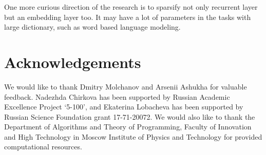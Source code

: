 \documentclass{article}
\begin{document}
One more curious direction of the research is to sparsify not only recurrent layer but an embedding layer too. It may have a lot of parameters in the tasks with large dictionary, such as word based language modeling. 

\vspace{-0.3cm}
\section*{Acknowledgements} 
\vspace{-0.1cm}
We would like to thank Dmitry Molchanov and Arsenii Ashukha for valuable feedback.
Nadezhda Chirkova has been supported by Russian Academic Excellence Project `5-100', and Ekaterina Lobacheva has been supported by Russian Science Foundation grant 17-71-20072.
We would also like to thank the Department of Algorithms and Theory
of Programming, Faculty of Innovation and High Technology
in Moscow Institute of Physics and Technology for provided computational resources.
\end{document}
